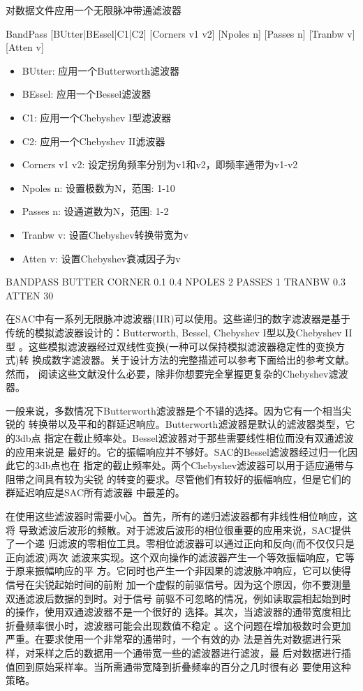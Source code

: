 \label{cmd:bandpass}

对数据文件应用一个无限脉冲带通滤波器

BandPass [BUtter|BEssel|C1|C2] [Corners v1 v2] [Npoles n] [Passes n] [Tranbw v] [Atten v]

\begin{itemize}
\item BUtter: 应用一个Butterworth滤波器
\item BEssel: 应用一个Bessel滤波器
\item C1: 应用一个Chebyshev I型滤波器
\item C2: 应用一个Chebyshev II滤波器
\item Corners v1 v2: 设定拐角频率分别为v1和v2，即频率通带为v1-v2
\item Npoles n: 设置极数为N，范围: 1-10
\item Passes n: 设通道数为N，范围: 1-2
\item Tranbw v: 设置Chebyshev转换带宽为v
\item Atten v: 设置Chebyshev衰减因子为v
\end{itemize}

BANDPASS BUTTER CORNER 0.1 0.4 NPOLES 2 PASSES 1 TRANBW 0.3 ATTEN 30

在SAC中有一系列无限脉冲滤波器(IIR)可以使用。这些递归的数字滤波器是基于
传统的模拟滤波器设计的：Butterworth, Bessel, Chebyshev I型以及Chebyshev II型
。这些模拟滤波器经过双线性变换(一种可以保持模拟滤波器稳定性的变换方式)转
换成数字滤波器。关于设计方法的完整描述可以参考下面给出的参考文献。然而，
阅读这些文献没什么必要，除非你想要完全掌握更复杂的Chebyshev滤波器。

一般来说，多数情况下Butterworth滤波器是个不错的选择。因为它有一个相当尖锐的
转换带以及平和的群延迟响应。Butterworth滤波器是默认的滤波器类型，它的3db点
指定在截止频率处。Bessel滤波器对于那些需要线性相位而没有双通滤波的应用来说是
最好的。它的振幅响应并不够好。SAC的Bessel滤波器经过归一化因此它的3db点也在
指定的截止频率处。两个Chebyshev滤波器可以用于适应通带与阻带之间具有较为尖锐
的转变的要求。尽管他们有较好的振幅响应，但是它们的群延迟响应是SAC所有滤波器
中最差的。

在使用这些滤波器时需要小心。首先，所有的递归滤波器都有非线性相位响应，这将
导致滤波后波形的频散。对于滤波后波形的相位很重要的应用来说，SAC提供了一个递
归滤波的零相位工具。零相位滤波器可以通过正向和反向(而不仅仅只是正向滤波)两次
滤波来实现。这个双向操作的滤波器产生一个等效振幅响应，它等于原来振幅响应的平
方。它同时也产生一个非因果的滤波脉冲响应，它可以使得信号在尖锐起始时间的前附
加一个虚假的前驱信号。因为这个原因，你不要测量双通滤波后数据的到时。对于信号
前驱不可忽略的情况，例如读取震相起始到时的操作，使用双通滤波器不是一个很好的
选择。其次，当滤波器的通带宽度相比折叠频率很小时，滤波器可能会出现数值不稳定
。这个问题在增加极数时会更加严重。在要求使用一个非常窄的通带时，一个有效的办
法是首先对数据进行采样，对采样之后的数据用一个通带宽一些的滤波器进行滤波，最
后对数据进行插值回到原始采样率。当所需通带宽降到折叠频率的百分之几时很有必	
要使用这种策略。


